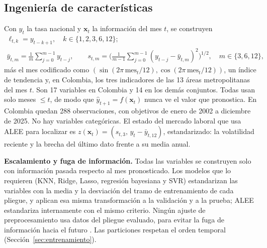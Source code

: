 \documentclass[11pt]{article}
\begin{document}
\begin{table}[H]
\centering
\caption{Distribución de la tasa de desempleo (\%) en cada conjunto: periodo, número de meses, media, desviación estándar, mínimo, máximo, asimetría y número de cambios mensuales atípicos (fuera de $[Q_1-3\,\mathrm{RIC},\,Q_3+3\,\mathrm{RIC}]$).}
\label{tab:objetivo}
\small
\resizebox{\textwidth}{!}{}
\end{table}

\subsection{Ingeniería de características}
\label{sec:variables}

Con $y_t$ la tasa nacional y $\mathbf{x}_t$ la información del mes $t$, se construyen
\begin{equation}
\begin{gathered}
\ell_{t,k}=y_{t-k+1},\quad k\in\{1,2,3,6,12\};\\
\bar y_{t,m}=\frac{1}{m}\sum_{j=0}^{m-1}y_{t-j},\qquad s_{t,m}=\Big(\frac{1}{m-1}\sum_{j=0}^{m-1}(y_{t-j}-\bar y_{t,m})^2\Big)^{1/2},\quad m\in\{3,6,12\},
\end{gathered}
\label{eq:variables}
\end{equation}
más el mes codificado como $(\sin(2\pi\,\mathrm{mes}_t/12),\cos(2\pi\,\mathrm{mes}_t/12))$, un índice de tendencia y, en Colombia, los tres indicadores de las 13 áreas metropolitanas del mes $t$. Son 17 variables en Colombia y 14 en los demás conjuntos. Todas usan solo meses $\le t$, de modo que $\hat y_{t+1}=f(\mathbf{x}_t)$ nunca ve el valor que pronostica. En Colombia quedan 288 observaciones, con objetivos de enero de 2002 a diciembre de 2025. No hay variables categóricas. El estado del mercado laboral que usa ALEE para localizar es $z(\mathbf{x}_t)=(s_{t,3},\,y_t-\bar y_{t,12})$, estandarizado: la volatilidad reciente y la brecha del último dato frente a su media anual.

\textbf{Escalamiento y fuga de información.} Todas las variables se construyen solo con información pasada respecto al mes pronosticado. Los modelos que lo requieren (KNN, Ridge, Lasso, regresión bayesiana y SVR) estandarizan las variables con la media y la desviación del tramo de entrenamiento de cada pliegue, y aplican esa misma transformación a la validación y a la prueba; ALEE estandariza internamente con el mismo criterio. Ningún ajuste de preprocesamiento usa datos del pliegue evaluado, para evitar la fuga de información hacia el futuro \cite{kapoor2023}. Las particiones respetan el orden temporal (Sección~\ref{sec:entrenamiento}).
\end{document}
